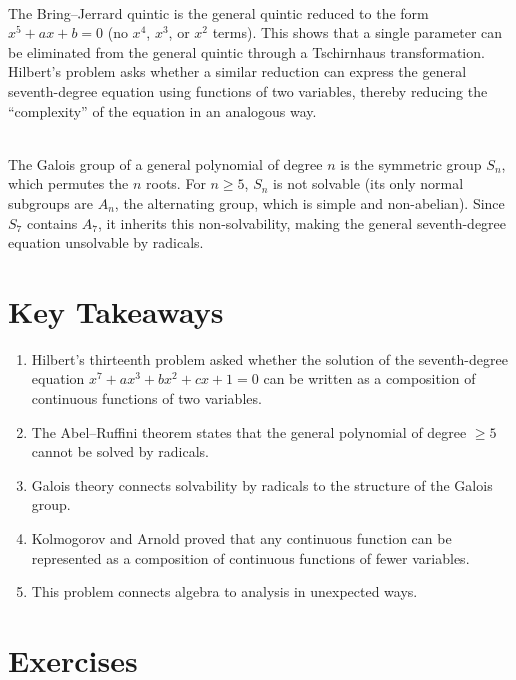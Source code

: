 \begin{description}[font=\bfseries, leftmargin=2em, style=nextline]
\item[Q: What is the Bring--Jerrard quintic?]\hfill\\
The Bring--Jerrard quintic is the general quintic reduced to the form $x^5 + ax + b = 0$ (no $x^4$, $x^3$, or $x^2$ terms). This shows that a single parameter can be eliminated from the general quintic through a Tschirnhaus transformation. Hilbert's problem asks whether a similar reduction can express the general seventh-degree equation using functions of two variables, thereby reducing the ``complexity'' of the equation in an analogous way.

\item[Q: Why does $S_7$ appear for degree~7?]\hfill\\
The Galois group of a general polynomial of degree $n$ is the symmetric group $S_n$, which permutes the $n$ roots. For $n \geq 5$, $S_n$ is not solvable (its only normal subgroups are $A_n$, the alternating group, which is simple and non-abelian). Since $S_7$ contains $A_7$, it inherits this non-solvability, making the general seventh-degree equation unsolvable by radicals.

\end{description}

\section*{Key Takeaways}

\begin{enumerate}
    \item Hilbert's thirteenth problem asked whether the solution of the seventh-degree equation $x^7 + ax^3 + bx^2 + cx + 1 = 0$ can be written as a composition of continuous functions of two variables.
    \item The Abel--Ruffini theorem states that the general polynomial of degree $\geq 5$ cannot be solved by radicals.
    \item Galois theory connects solvability by radicals to the structure of the Galois group.
    \item Kolmogorov and Arnold proved that any continuous function can be represented as a composition of continuous functions of fewer variables.
    \item This problem connects algebra to analysis in unexpected ways.
\end{enumerate}

\section*{Exercises}

